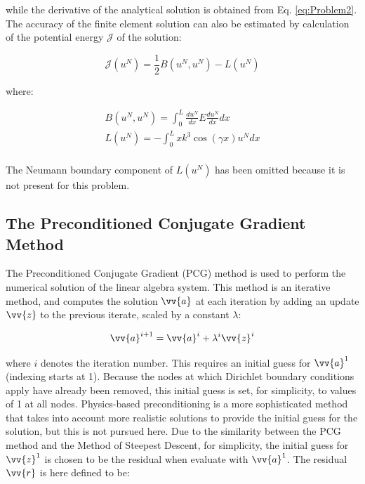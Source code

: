 \documentclass[10pt]{article}
\begin{document}
while the derivative of the analytical solution is obtained from Eq. \eqref{eq:Problem2}. The accuracy of the finite element solution can also be estimated by calculation of the potential energy \(\mathscr{J}\) of the solution:

\begin{equation}
\mathscr{J}(u^N)=\frac{1}{2}B(u^N, u^N)-L(u^N)
\end{equation}

where:

\begin{equation}
\begin{aligned}
B(u^N, u^N)=\int_{0}^{L}\frac{du^N}{dx}E\frac{du^N}{dx}dx\\
L(u^N)=-\int_{0}^{L}xk^3\cos{(\gamma x)}u^Ndx\\
\end{aligned}
\end{equation}

The Neumann boundary component of \(L(u^N)\) has been omitted because it is not present for this problem.

\subsection{The Preconditioned Conjugate Gradient Method}

The Preconditioned Conjugate Gradient (PCG) method is used to perform the numerical solution of the linear algebra system. This method is an iterative method, and computes the solution \(\vv{a}\) at each iteration by adding an update \(\vv{z}\) to the previous iterate, scaled by a constant \(\lambda\):

\begin{equation}
\label{eq:PCGUpdate}
\vv{a}^{i+1}=\vv{a}^i+\lambda^i\vv{z}^i
\end{equation}

where \(i\) denotes the iteration number. This requires an initial guess for \(\vv{a}^1\) (indexing starts at 1). Because the nodes at which Dirichlet boundary conditions apply have already been removed, this initial guess is set, for simplicity, to values of 1 at all nodes. Physics-based preconditioning is a more sophisticated method that takes into account more realistic solutions to provide the initial guess for the solution, but this is not pursued here. Due to the similarity between the PCG method and the Method of Steepest Descent, for simplicity, the initial guess for \(\vv{z}^1\) is chosen to be the residual when evaluate with \(\vv{a}^1\). The residual \(\vv{r}\) is here defined to be:
\end{document}
